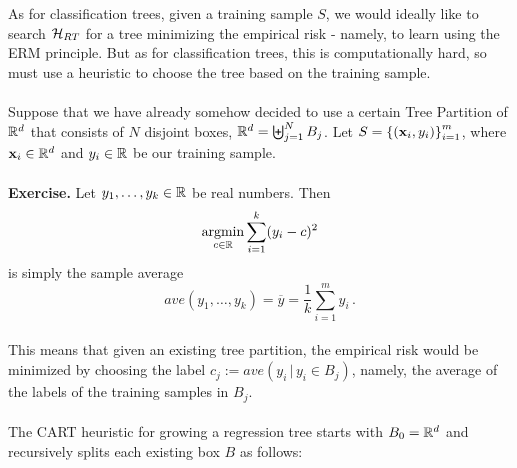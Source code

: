     As for classification trees, given a training sample $S$,
     we would ideally like to search $\mathcal{H}_{RT}$ for a tree minimizing the
     empirical risk - namely, to learn using the ERM principle. But as for
     classification trees, this is computationally hard, so must use a heuristic
     to choose the tree based on the training sample.
\\~\\
     Suppose that we have already somehow 
 decided to use a certain Tree Partition of $\mathbb{R}^d$ that consists of $N$ disjoint boxes,
 $\mathbb{R}^d=\biguplus_{j=1}^N B_j$. Let $S=\left\{ (\mathbf{x}_i,y_i)
 \right\}_{i=1}^m$, where $\mathbf{x}_i\in \mathbb{R}^d$ and $y_i\in\mathbb{R}$ be our training sample.
\\~\\
 {\bf Exercise.} Let $y_1,\ldots,y_k\in\mathbb{R}$ be real numbers. Then
 \[
   \operatorname*{argmin}_{c\in\mathbb{R}} \sum_{i=1}^k (y_i-c)^2
 \]
 is simply the sample average
 \[
   ave(y_1,\ldots,y_k) = \overline{y} = \frac{1}{k}\sum_{i=1}^m y_i\,.
 \]
~\\
 This means that given an existing tree partition, the empirical risk would be
 minimized by choosing the label $c_j:= ave(y_i \,|\, y_i\in B_j)$, namely, the
 average of the labels of the training samples in $B_j$.
\\~\\
 The CART heuristic for growing a regression tree starts with $B_0=\mathbb{R}^d$ and recursively splits each existing
 box $B$ as follows:
